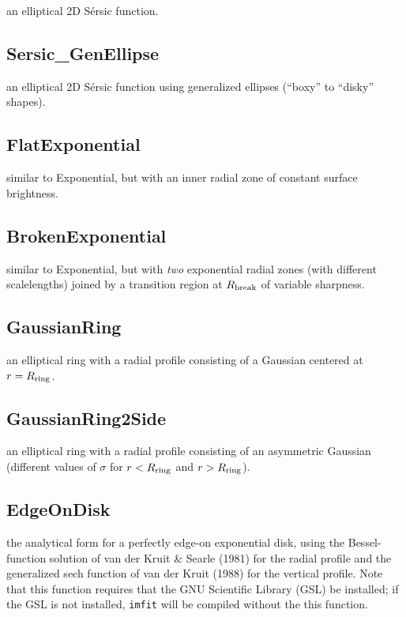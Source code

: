 \documentclass[10pt]{article}
\newcommand{\imfit}{\texttt{imfit}}
\begin{document}
an elliptical 2D S\'ersic function.


\subsection{Sersic\_GenEllipse}
an elliptical 2D S\'ersic function using
generalized ellipses (``boxy'' to ``disky'' shapes).


\subsection{FlatExponential} 

similar to Exponential, but with an inner radial zone
of constant surface brightness.


\subsection{BrokenExponential}

similar to Exponential, but with \textit{two}
exponential radial zones (with different scalelengths) joined by a transition region
at $R_{\rm break}$ of variable sharpness.


\subsection{GaussianRing}

an elliptical ring with a radial profile
consisting of a Gaussian centered at $r = R_{\rm ring}$.


\subsection{GaussianRing2Side}

an elliptical ring with a radial profile
consisting of an asymmetric Gaussian (different values of $\sigma$ for
$r < R_{\rm ring}$ and $r > R_{\rm ring}$).


\subsection{EdgeOnDisk}

the analytical form for a perfectly edge-on exponential
disk, using the Bessel-function solution of van der Kruit \& Searle (1981) for 
the radial profile and the generalized sech function of van der Kruit (1988) 
for the vertical profile. Note that this function requires that the GNU
Scientific Library (GSL) be installed; if the GSL is not installed, \imfit{}
will be compiled without the this function.
\end{document}
